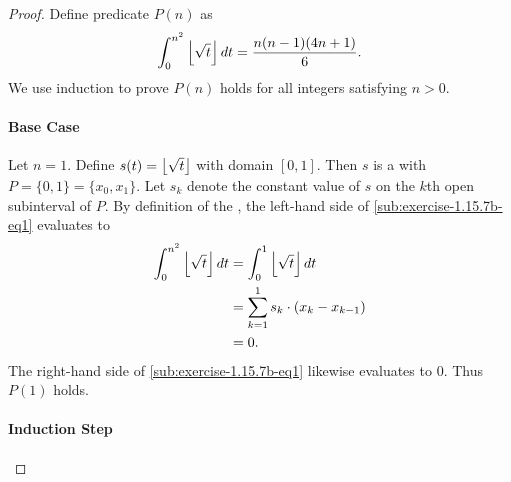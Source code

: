 \documentclass{report}
\begin{document}
\begin{proof}

  Define predicate $P(n)$ as
    \begin{equation}
      \label{sub:exercise-1.15.7b-eq1}
      \int_0^{n^2} \left\lfloor\sqrt{t}\right\rfloor \mathop{dt} = \frac{n(n - 1)(4n + 1)}{6}.
    \end{equation}
  We use induction to prove $P(n)$ holds for all integers satisfying $n > 0$.

  \paragraph{Base Case}%

    Let $n = 1$.
    Define $s(t) = \left\lfloor\sqrt{t}\right\rfloor$ with domain $[0, 1]$.
    Then $s$ is a  with 
      $P = \{0, 1\} = \{x_0, x_1\}$.
    Let $s_k$ denote the constant value of $s$ on the $k$th open subinterval of
      $P$.
    By definition of the , the left-hand
      side of \eqref{sub:exercise-1.15.7b-eq1} evaluates to
      \begin{align*}
        \int_0^{n^2} \left\lfloor\sqrt{t}\right\rfloor \mathop{dt}
          & = \int_0^1 \left\lfloor\sqrt{t}\right\rfloor \mathop{dt} \\
          & = \sum_{k=1}^1 s_k \cdot (x_k - x_{k-1}) \\
          & = 0.
      \end{align*}
    The right-hand side of \eqref{sub:exercise-1.15.7b-eq1} likewise evaluates
      to $0$.
    Thus $P(1)$ holds.

  \paragraph{Induction Step}%


\end{proof}
\end{document}
